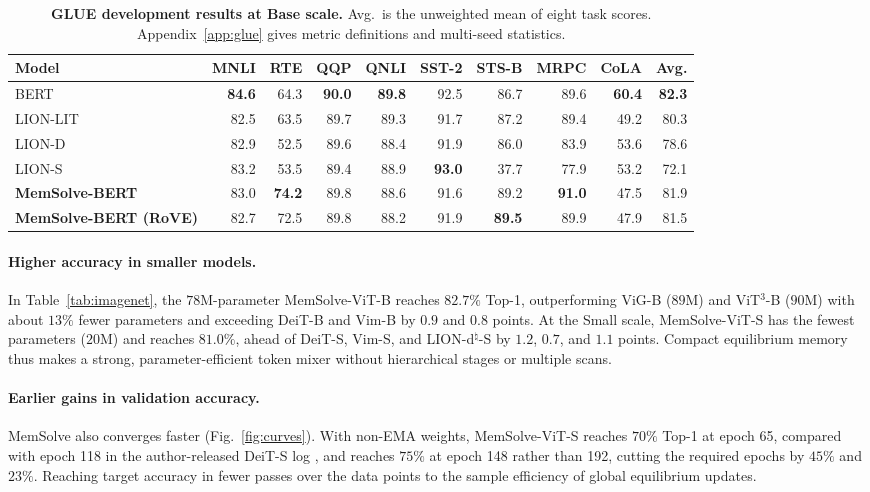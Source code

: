 \documentclass[10pt,twocolumn]{article}
\let\draftsmall\small
\renewcommand{\small}{\draftsmall\fontsize{9}{10}\selectfont}
\begin{document}
\begin{table}[t]
\centering
\captionsetup{width=.86\textwidth}
\caption{\textbf{GLUE development results at Base scale.}
Avg.\ is the unweighted mean of eight task scores.
Appendix~\ref{app:glue} gives metric definitions and multi-seed statistics.}
\label{tab:glue}
\setlength{\tabcolsep}{7.8pt}
\renewcommand{\arraystretch}{1.04}
\small
\begin{tabular}{lrrrrrrrrr}
\toprule
Model & MNLI & RTE & QQP & QNLI & SST-2 & STS-B & MRPC & CoLA & Avg.\\
\midrule
BERT &\textbf{84.6}&64.3&\textbf{90.0}&\textbf{89.8}&92.5&86.7&89.6&\textbf{60.4}&\textbf{82.3}\\
LION-LIT &82.5&63.5&89.7&89.3&91.7&87.2&89.4&49.2&80.3\\
LION-D &82.9&52.5&89.6&88.4&91.9&86.0&83.9&53.6&78.6\\
LION-S &83.2&53.5&89.4&88.9&\textbf{93.0}&37.7&77.9&53.2&72.1\\
\midrule
\rowcolor{ResultYellow}
\textbf{MemSolve-BERT} &83.0&\textbf{74.2}&89.8&88.6&91.6&89.2&\textbf{91.0}&47.5&81.9\\
\rowcolor{ResultYellow}
\textbf{MemSolve-BERT (RoVE)} &82.7&72.5&89.8&88.2&91.9&\textbf{89.5}&89.9&47.9&81.5\\
\bottomrule
\end{tabular}
\end{table}

\paragraph{Higher accuracy in smaller models.}
In Table~\ref{tab:imagenet}, the $78$M-parameter MemSolve-ViT-B reaches
$82.7\%$ Top-1, outperforming ViG-B ($89$M) and ViT$^3$-B ($90$M) with about
$13\%$ fewer parameters and exceeding DeiT-B and Vim-B by $0.9$ and $0.8$
points.
At the Small scale, MemSolve-ViT-S has the fewest parameters ($20$M) and
reaches $81.0\%$, ahead of DeiT-S, Vim-S, and LION-d$^\natural$-S by $1.2$,
$0.7$, and $1.1$ points.
Compact equilibrium memory thus makes a strong, parameter-efficient token
mixer without hierarchical stages or multiple scans.

\paragraph{Earlier gains in validation accuracy.}
MemSolve also converges faster (Fig.~\ref{fig:curves}).
With non-EMA weights, MemSolve-ViT-S reaches $70\%$ Top-1 at epoch 65,
compared with epoch 118 in the author-released DeiT-S log
\cite{touvron2021deit}, and reaches $75\%$ at epoch 148 rather than 192,
cutting the required epochs by $45\%$ and $23\%$.
Reaching target accuracy in fewer passes over the data points to the sample
efficiency of global equilibrium updates.
\end{document}
